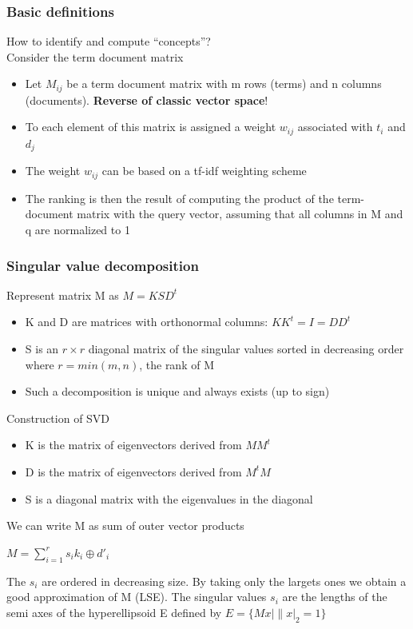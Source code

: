 \subsubsection{Basic definitions}
How to identify and compute ``concepts''? \\
Consider the term document matrix
\begin{itemize}
\item Let $ M_{ij} $ be a term document matrix with m rows (terms) and
  n columns (documents). \textbf{Reverse of classic vector space}!
\item To each element of this matrix is assigned a weight $ w_{ij} $
  associated with $ t_i $ and $ d_j $
\item The weight $ w_{ij} $ can be based on a tf-idf weighting scheme
\item The ranking is then the result of computing the product of the
  term-document matrix with the query vector, assuming that all
  columns in M and q are normalized to 1
\end{itemize}

\subsubsection{Singular value decomposition}
Represent matrix M as $ M = K S D^t $
\begin{itemize}
\item K and D are matrices with orthonormal columns: $ K K^t = I = D
  D^t $
\item S is an $ r \times r $ diagonal matrix of the singular values
  sorted in decreasing order where $ r = min(m, n) $, the rank of M
\item Such a decomposition is unique and always exists (up to sign)
\end{itemize}

Construction of SVD
\begin{itemize}
\item K is the matrix of eigenvectors derived from $ M M^t $
\item D is the matrix of eigenvectors derived from $ M^t M $
\item S is a diagonal matrix with the eigenvalues in the diagonal
\end{itemize}

We can write M as sum of outer vector products

$ M = \sum_{i = 1}^r s_i k_i \oplus d'_i $

The $ s_i $ are ordered in decreasing size.
By taking only the largets ones we obtain a good approximation of M
(LSE). The singular values $ s_i $ are the lengths of the semi axes of
the hyperellipsoid E defined by $ E = \big\{ Mx \mid \| x |_2 = 1
  \big\} $ \\

